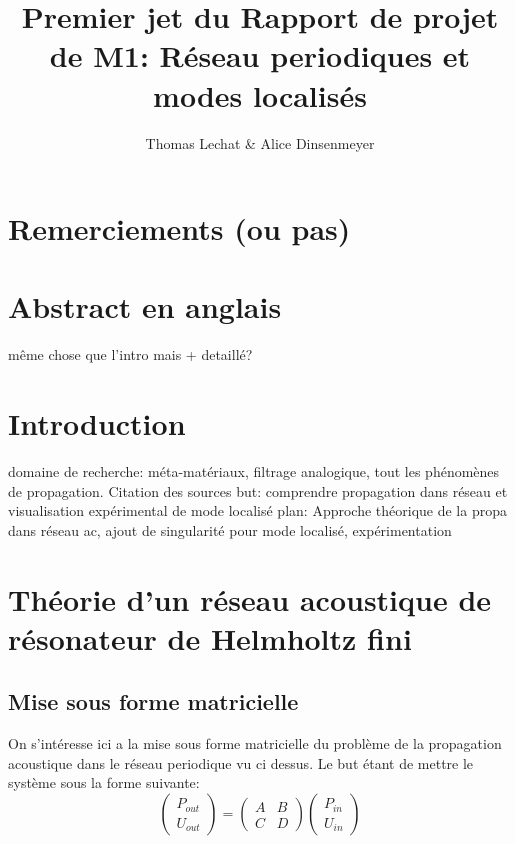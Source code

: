 \documentclass[a4paper]{report}
\title{Premier jet du Rapport de projet de M1: Réseau periodiques et modes localisés }
\author{Thomas Lechat \& Alice Dinsenmeyer}
\begin{document}
\maketitle
\tableofcontents

\chapter{Remerciements (ou pas)}

\chapter{Abstract en anglais}
même chose que l'intro mais + detaillé?

\chapter{Introduction}

domaine de recherche: méta-matériaux, filtrage analogique, tout les phénomènes de propagation.
Citation des sources
but: comprendre propagation dans réseau et visualisation expérimental de mode localisé
plan: Approche théorique de la propa dans réseau ac, ajout de singularité pour mode localisé, expérimentation


\chapter{Théorie d'un réseau acoustique de résonateur de Helmholtz fini}

\section{Mise sous forme matricielle}
On s’intéresse ici a la mise sous forme matricielle du problème de la propagation acoustique dans le réseau periodique vu ci dessus. Le but étant de mettre le système sous la forme suivante:
\begin{equation}
\begin{pmatrix} P_{out} \\ U_{out} \end{pmatrix} =\begin{pmatrix} A & B \\ C & D \end{pmatrix} \begin{pmatrix} P_{in} \\ U_{in} \end{pmatrix} 
\end{equation}
\end{document}
